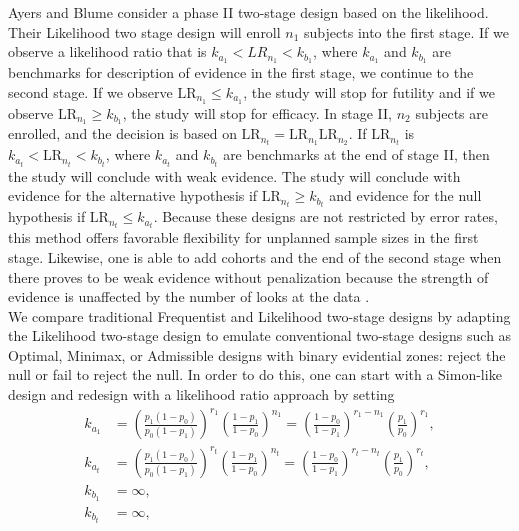 \documentclass[12pt]{report}\usepackage[]{graphicx}\usepackage[]{color}
\newlength{\li}\setlength{\li}{14.48pt}
\newlength{\di}\setlength{\di}{-3.5mm}
\begin{document}
\indent Ayers and Blume \cite{Ayers} consider a phase II two-stage design based on the likelihood. Their Likelihood two stage design will enroll $n_1$ subjects into the first stage. If we observe a likelihood ratio that is $k_{a_1} < LR_{n_1} < k_{b_1}$, where $k_{a_1}$ and $k_{b_1}$ are benchmarks for description of evidence in the first stage, we continue to the second stage. If we observe $\mbox{LR}_{n_1} \leq k_{a_1}$, the study will stop for futility and if we observe $\mbox{LR}_{n_1} \geq k_{b_1}$, the study will stop for efficacy. In stage II, $n_2$ subjects are enrolled, and the decision is based on $\mbox{LR}_{n_t} = \mbox{LR}_{n_1}\mbox{LR}_{n_2}$. If $\mbox{LR}_{n_t}$ is $k_{a_t} < \mbox{LR}_{n_t} < k_{b_t}$, where $k_{a_t}$ and $k_{b_t}$ are benchmarks at the end of stage II, then the study will conclude with weak evidence. The study will conclude with evidence for the alternative hypothesis if $\mbox{LR}_{n_t} \geq k_{b_t}$ and evidence for the null hypothesis if $\mbox{LR}_{n_t} \leq k_{a_t}$. Because these designs are not restricted by error rates, this method offers favorable flexibility for unplanned sample sizes in the first stage. Likewise, one is able to add cohorts and the end of the second stage when there proves to be weak evidence without penalization because the strength of evidence is unaffected by the number of looks at the data \cite{Blume2002}. \\

\indent We compare traditional Frequentist and Likelihood two-stage designs by adapting the Likelihood two-stage design to emulate conventional two-stage designs such as Optimal, Minimax, or Admissible designs with binary evidential zones: reject the null or fail to reject the null. In order to do this, one can start with a Simon-like design and redesign with a likelihood ratio approach by setting
\begin{equation}
\begin{aligned}
k_{a_1} &= \left(\frac{p_1(1-p_0)}{p_0(1-p_1)}\right)^{r_1} \left(\frac{1-p_1}{1-p_0}\right)^{n_1} = \left(\frac{1-p_0}{1-p_1}\right)^{r_1-n_1} \left(\frac{p_1}{p_0}\right)^{r_1},\\ 
k_{a_t}  &= \left(\frac{p_1(1-p_0)}{p_0(1-p_1)}\right)^{r_t} \left(\frac{1-p_1}{1-p_0}\right)^{n_t} = \left(\frac{1-p_0}{1-p_1}\right)^{r_t-n_t} \left(\frac{p_1}{p_0}\right)^{r_t},\\ k_{b_1} &= \infty, \\
k_{b_t} &= \infty,
\end{aligned}
\end{equation}
\end{document}
